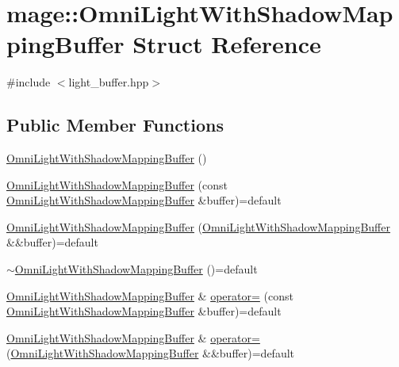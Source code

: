 \hypertarget{structmage_1_1_omni_light_with_shadow_mapping_buffer}{}\section{mage\+:\+:Omni\+Light\+With\+Shadow\+Mapping\+Buffer Struct Reference}
\label{structmage_1_1_omni_light_with_shadow_mapping_buffer}


{\ttfamily \#include $<$light\+\_\+buffer.\+hpp$>$}

\subsection*{Public Member Functions}
\begin{DoxyCompactItemize}
\item 
\hyperlink{structmage_1_1_omni_light_with_shadow_mapping_buffer_a02ade96988185cc3b0f24f4618534935}{Omni\+Light\+With\+Shadow\+Mapping\+Buffer} ()
\item 
\hyperlink{structmage_1_1_omni_light_with_shadow_mapping_buffer_a6aabe633e5b81842a7686561c8af30fc}{Omni\+Light\+With\+Shadow\+Mapping\+Buffer} (const \hyperlink{structmage_1_1_omni_light_with_shadow_mapping_buffer}{Omni\+Light\+With\+Shadow\+Mapping\+Buffer} \&buffer)=default
\item 
\hyperlink{structmage_1_1_omni_light_with_shadow_mapping_buffer_afb66f7933b73e60c234dc89e3033271a}{Omni\+Light\+With\+Shadow\+Mapping\+Buffer} (\hyperlink{structmage_1_1_omni_light_with_shadow_mapping_buffer}{Omni\+Light\+With\+Shadow\+Mapping\+Buffer} \&\&buffer)=default
\item 
\hyperlink{structmage_1_1_omni_light_with_shadow_mapping_buffer_ac28ea25ecb8f27be2403c37a16fd9631}{$\sim$\+Omni\+Light\+With\+Shadow\+Mapping\+Buffer} ()=default
\item 
\hyperlink{structmage_1_1_omni_light_with_shadow_mapping_buffer}{Omni\+Light\+With\+Shadow\+Mapping\+Buffer} \& \hyperlink{structmage_1_1_omni_light_with_shadow_mapping_buffer_ab94e93f02ca982d85be2bd8da2714c01}{operator=} (const \hyperlink{structmage_1_1_omni_light_with_shadow_mapping_buffer}{Omni\+Light\+With\+Shadow\+Mapping\+Buffer} \&buffer)=default
\item 
\hyperlink{structmage_1_1_omni_light_with_shadow_mapping_buffer}{Omni\+Light\+With\+Shadow\+Mapping\+Buffer} \& \hyperlink{structmage_1_1_omni_light_with_shadow_mapping_buffer_ad7801e067fde2f54f0c328b2e34ed118}{operator=} (\hyperlink{structmage_1_1_omni_light_with_shadow_mapping_buffer}{Omni\+Light\+With\+Shadow\+Mapping\+Buffer} \&\&buffer)=default
\end{DoxyCompactItemize}
